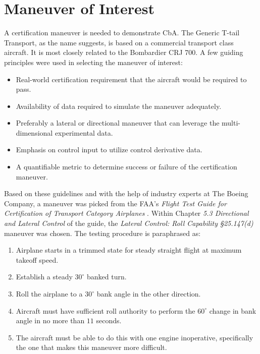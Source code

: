 \section{Maneuver of Interest} \label{sec:maneuver}

A certification maneuver is needed to demonstrate CbA.
The Generic T-tail Transport, as the name suggests, is based on a commercial transport class aircraft.
It is most closely related to the Bombardier CRJ 700.
A few guiding principles were used in selecting the maneuver of interest:
\begin{itemize}
    \item Real-world certification requirement that the aircraft would be required to pass.
    \item Availability of data required to simulate the maneuver adequately.
    \item Preferably a lateral or directional maneuver that can leverage the multi-dimensional experimental data.
    \item Emphasis on control input to utilize control derivative data.
    \item A quantifiable metric to determine success or failure of the certification maneuver.
\end{itemize}

Based on these guidelines and with the help of industry experts at The Boeing Company, a maneuver was picked from the FAA's \textit{Flight Test Guide for Certification of Transport Category Airplanes} \cite{romanowski_flight_2018}.
Within Chapter \textit{5.3 Directional and Lateral Control} of the guide, the \textit{Lateral Control: Roll Capability \S 25.147(d)} maneuver was chosen.   
The testing procedure is paraphrased as: 
\begin{enumerate}
    \item Airplane starts in a trimmed state for steady straight flight at maximum takeoff speed.
    \item Establish a steady $30^\circ$ banked turn.
    \item Roll the airplane to a $30^\circ$ bank angle in the other direction.
    \item Aircraft must have sufficient roll authority to perform the $60^\circ$ change in bank angle in no more than $11$ seconds. 
    \item The aircraft must be able to do this with one engine inoperative, specifically the one that makes this maneuver more difficult.

\end{enumerate}

